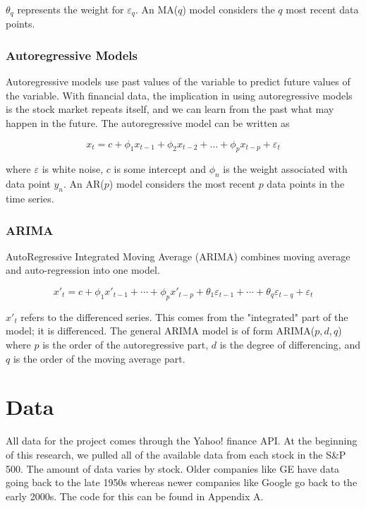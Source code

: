 \documentclass[12pt]{article}
\begin{document}
$\theta_q$ represents the weight for $\varepsilon_q$. An MA($q$) model considers the $q$ most recent data points. \cite[8.4]{forecasting}


\subsubsection{Autoregressive Models}
Autoregressive models use past values of the variable to predict future values of the variable. With financial data, the implication in using autoregressive models is the stock market repeats itself, and we can learn from the past what may happen in the future. \cite[8.3]{forecasting} The autoregressive model can be written as 

$$x_{t} = c + \phi_{1}x_{t-1} + \phi_{2}x_{t-2} + \dots + \phi_{p}x_{t-p} + \varepsilon_{t}$$

where $\varepsilon$ is white noise, $c$ is some intercept and $\phi_n$ is the weight associated with data point $y_n$. An AR($p$) model considers the most recent $p$ data points in the time series.

\subsubsection{ARIMA}
AutoRegressive Integrated Moving Average (ARIMA) combines moving average and auto-regression into one model. 

$$ x'_{t} = c + \phi_{1}x'_{t-1} + \cdots + \phi_{p}x'_{t-p} + \theta_{1}\varepsilon_{t-1} + \cdots + \theta_{q}\varepsilon_{t-q} + \varepsilon_{t} $$

$x'_t$ refers to the differenced series. This comes from the "integrated" part of the model; it is differenced. The general ARIMA model is of form ARIMA($p,d,q$) where $p$ is the order of the autoregressive part, $d$ is the degree of differencing, and $q$ is the order of the moving average part. \cite[8.5]{forecasting}

\section{Data}
All data for the project comes through the Yahoo! finance API. At the beginning of this research, we pulled all of the available data from each stock in the S\&P 500. The amount of data varies by stock. Older companies like GE have data going back to the late 1950s whereas newer companies like Google go back to the early 2000s. The code for this can be found in Appendix A.
\end{document}
